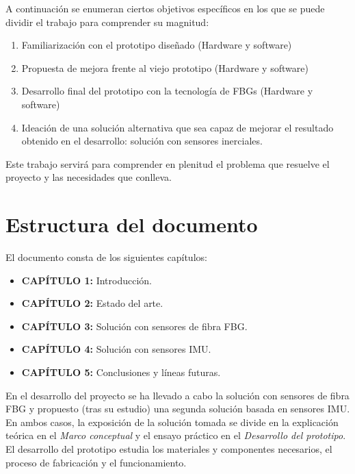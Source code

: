 A continuación se enumeran ciertos objetivos específicos en los que se puede dividir el trabajo para comprender su magnitud: 

\begin{enumerate}
	\item Familiarización con el prototipo diseñado (Hardware y software)
	\item Propuesta de mejora frente al viejo prototipo (Hardware y software)
	\item Desarrollo final del prototipo con la tecnología de FBGs (Hardware y software)
	\item Ideación de una solución alternativa que sea capaz de mejorar el resultado obtenido en el desarrollo: solución con sensores inerciales.
	
\end{enumerate}

Este trabajo servirá para comprender en plenitud el problema que resuelve el proyecto y las necesidades que conlleva.


\section{Estructura del documento}
\label{sec:disposicion1}

El documento consta de los siguientes capítulos: 

\begin{itemize}[label=]
	\item {\textbf{CAPÍTULO 1:} Introducción.}
	\item {\textbf{CAPÍTULO 2:} Estado del arte.}
	\item {\textbf{CAPÍTULO 3:} Solución con sensores de fibra FBG.}
	\item {\textbf{CAPÍTULO 4:} Solución con sensores IMU.}
	\item {\textbf{CAPÍTULO 5:} Conclusiones y líneas futuras.}
\end{itemize}


En el desarrollo del proyecto se ha llevado a cabo la solución con sensores de fibra FBG y propuesto (tras su estudio) una segunda solución basada en sensores IMU. En ambos casos, la exposición de la solución tomada se divide en la explicación teórica en el \textit{Marco conceptual} y el ensayo práctico en el \textit{Desarrollo del prototipo}. El desarrollo del prototipo estudia los materiales y componentes necesarios, el proceso de fabricación y el funcionamiento. 


